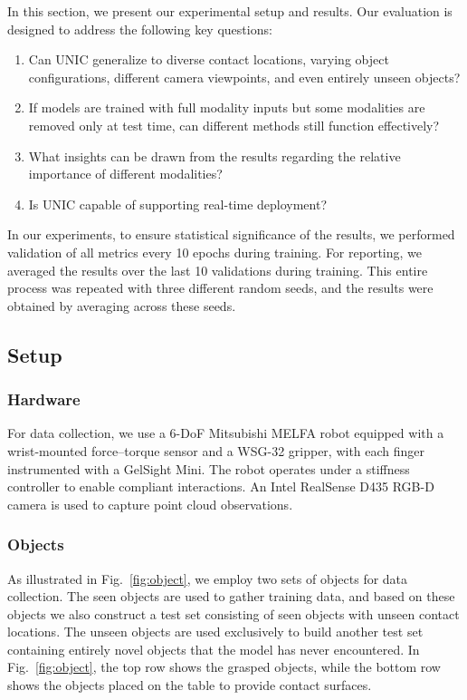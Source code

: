 \documentclass[letterpaper, 10 pt, conference]{ieeeconf}  %
\newcommand{\unic}{\textsc{UNIC}}
\begin{document}
In this section, we present our experimental setup and results. Our evaluation is designed to address the following key questions: 

\begin{enumerate}

\item Can \unic{} generalize to diverse contact locations, varying object configurations, different camera viewpoints, and even entirely unseen objects?

\item If models are trained with full modality inputs but some modalities are removed only at test time, can different methods still function effectively?

\item What insights can be drawn from the results regarding the relative importance of different modalities?

\item Is \unic{} capable of supporting real-time deployment?
\end{enumerate}

In our experiments, to ensure statistical significance of the results, we performed validation of all metrics every 10 epochs during training. For reporting, we averaged the results over the last 10 validations during training. This entire process was repeated with three different random seeds, and the results were obtained by averaging across these seeds.


\subsection{Setup}\label{sec:hardwaresetup}

\subsubsection{Hardware}
For data collection, we use a 6-DoF Mitsubishi MELFA robot equipped with a wrist-mounted force–torque sensor and a WSG-32 gripper, with each finger instrumented with a GelSight Mini. The robot operates under a stiffness controller to enable compliant interactions. An Intel RealSense D435 RGB-D camera is used to capture point cloud observations.

\subsubsection{Objects}\label{sec:object_exp}
As illustrated in Fig.~\ref{fig:object}, we employ two sets of objects for data collection. The seen objects are used to gather training data, and based on these objects we also construct a test set consisting of seen objects with unseen contact locations. The unseen objects are used exclusively to build another test set containing entirely novel objects that the model has never encountered. In Fig.~\ref{fig:object}, the top row shows the grasped objects, while the bottom row shows the objects placed on the table to provide contact surfaces.
\end{document}
